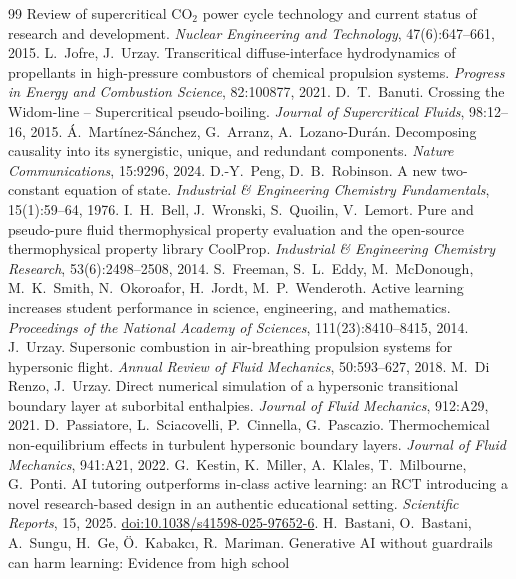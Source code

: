 \documentclass[11pt]{article}
\begin{document}
\begin{thebibliography}{99}
Review of supercritical CO$_2$ power cycle technology and current status of research and
development. \emph{Nuclear Engineering and Technology}, 47(6):647--661, 2015.
 L.\ Jofre, J.\ Urzay. Transcritical diffuse-interface hydrodynamics
of propellants in high-pressure combustors of chemical propulsion systems. \emph{Progress
in Energy and Combustion Science}, 82:100877, 2021.
 D.\ T.\ Banuti. Crossing the Widom-line -- Supercritical pseudo-boiling.
\emph{Journal of Supercritical Fluids}, 98:12--16, 2015.
 \'A.\ Mart\'inez-S\'anchez, G.\ Arranz, A.\ Lozano-Dur\'an.
Decomposing causality into its synergistic, unique, and redundant components. \emph{Nature
Communications}, 15:9296, 2024.
 D.-Y.\ Peng, D.\ B.\ Robinson. A new two-constant equation of
state. \emph{Industrial \& Engineering Chemistry Fundamentals}, 15(1):59--64, 1976.
 I.\ H.\ Bell, J.\ Wronski, S.\ Quoilin, V.\ Lemort. Pure and
pseudo-pure fluid thermophysical property evaluation and the open-source thermophysical
property library CoolProp. \emph{Industrial \& Engineering Chemistry Research},
53(6):2498--2508, 2014.
 S.\ Freeman, S.\ L.\ Eddy, M.\ McDonough, M.\ K.\ Smith, N.\ Okoroafor,
H.\ Jordt, M.\ P.\ Wenderoth. Active learning increases student performance in science,
engineering, and mathematics. \emph{Proceedings of the National Academy of Sciences},
111(23):8410--8415, 2014.
 J.\ Urzay. Supersonic combustion in air-breathing propulsion systems for
hypersonic flight. \emph{Annual Review of Fluid Mechanics}, 50:593--627, 2018.
 M.\ Di Renzo, J.\ Urzay. Direct numerical simulation of a
hypersonic transitional boundary layer at suborbital enthalpies. \emph{Journal of Fluid
Mechanics}, 912:A29, 2021.
 D.\ Passiatore, L.\ Sciacovelli, P.\ Cinnella, G.\ Pascazio.
Thermochemical non-equilibrium effects in turbulent hypersonic boundary layers.
\emph{Journal of Fluid Mechanics}, 941:A21, 2022.
 G.\ Kestin, K.\ Miller, A.\ Klales, T.\ Milbourne, G.\ Ponti. AI tutoring
outperforms in-class active learning: an RCT introducing a novel research-based design in an
authentic educational setting. \emph{Scientific Reports}, 15, 2025.
\href{https://doi.org/10.1038/s41598-025-97652-6}{doi:10.1038/s41598-025-97652-6}.
 H.\ Bastani, O.\ Bastani, A.\ Sungu, H.\ Ge, \"O.\ Kabakc\i{}, R.\
Mariman. Generative AI without guardrails can harm learning: Evidence from high school

\end{thebibliography}
\end{document}

